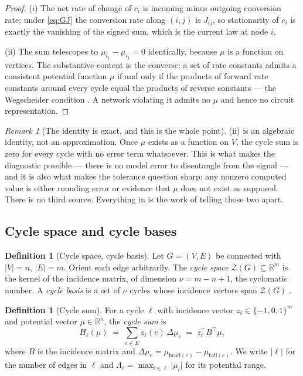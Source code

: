 \documentclass[11pt,twocolumn,a4paper]{article}
\theoremstyle{pstyle}
\theoremstyle{definition}
\newtheorem{definition}[theorem]{Definition}
\theoremstyle{remark}
\newtheorem{remark}[theorem]{Remark}
\newcommand{\R}{\mathbb{R}}
\newcommand{\abs}[1]{\lvert#1\rvert}
\newcommand{\hol}{H}
\begin{document}
\begin{proof}
(i) The net rate of change of $c_i$ is incoming minus outgoing
conversion rate; under \eqref{eq:GJ} the conversion rate along $(i,j)$
is $J_{ij}$, so stationarity of $c_i$ is exactly the vanishing of the
signed sum, which is the current law at node $i$.

(ii) The sum telescopes to $\mu_{i_1}-\mu_{i_1}=0$ identically, because
$\mu$ is a function on vertices. The substantive content is the
converse: a set of rate constants admits a consistent potential function
$\mu$ if and only if the products of forward rate constants around every
cycle equal the products of reverse constants --- the Wegscheider
condition \citep{wegscheider1901,schuster1989}. A network violating it
admits no $\mu$ and hence no circuit representation.
\end{proof}

\begin{remark}[The identity is exact, and this is the whole point]
\label{rem:exact}
(ii) is an algebraic identity, not an
approximation. Once $\mu$ exists as a function on $V$, the cycle sum is
zero for every cycle with no error term whatsoever. This is what makes
the diagnostic possible --- there is no model error to disentangle from
the signal --- and it is also what makes the tolerance question sharp:
any nonzero computed value is either rounding error or evidence that
$\mu$ does not exist as supposed. There is no third source. Everything
in  is the work of telling
those two apart.
\end{remark}

\subsection{Cycle space and cycle bases}

\begin{definition}[Cycle space, cycle basis]
\label{def:cyclespace}
Let $G=(V,E)$ be connected with $\abs{V}=n$, $\abs{E}=m$. Orient each
edge arbitrarily. The \emph{cycle space} $\mathcal{Z}(G)\subseteq\R^{m}$
is the kernel of the incidence matrix, of dimension
$\nu = m-n+1$, the cyclomatic number. A \emph{cycle basis} is a set of
$\nu$ cycles whose incidence vectors span $\mathcal{Z}(G)$
\citep{diestel2017,bollobas1998,kavitha2009}.
\end{definition}

\begin{definition}[Cycle sum]
\label{def:cyclesum}
For a cycle $\ell$ with incidence vector $z_\ell\in\{-1,0,1\}^{m}$ and
potential vector $\mu\in\R^{n}$, the \emph{cycle sum} is
\begin{equation}
  \hol_\ell(\mu) \;=\; \sum_{e\in E} z_\ell(e)\,\Delta\mu_e
  \;=\; z_\ell^{\top} B^{\top}\mu,
  \label{eq:cyclesum}
\end{equation}
where $B$ is the incidence matrix and $\Delta\mu_e = \mu_{\mathrm{head}(e)}
- \mu_{\mathrm{tail}(e)}$. We write $\abs{\ell}$ for the number of edges
in $\ell$ and
$\Lambda_\ell = \max_{i\in\ell}\abs{\mu_i}$ for its potential range.
\end{definition}
\end{document}
